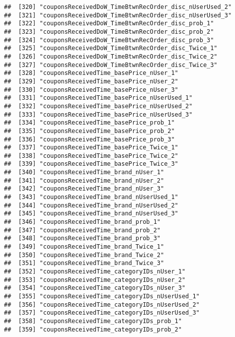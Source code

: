 \documentclass[10pt]{report}
\begin{document}
\begin{verbatim}
##  [320] "couponsReceivedDoW_TimeBtwnRecOrder_disc_nUserUsed_2" 
##  [321] "couponsReceivedDoW_TimeBtwnRecOrder_disc_nUserUsed_3" 
##  [322] "couponsReceivedDoW_TimeBtwnRecOrder_disc_prob_1"      
##  [323] "couponsReceivedDoW_TimeBtwnRecOrder_disc_prob_2"      
##  [324] "couponsReceivedDoW_TimeBtwnRecOrder_disc_prob_3"      
##  [325] "couponsReceivedDoW_TimeBtwnRecOrder_disc_Twice_1"     
##  [326] "couponsReceivedDoW_TimeBtwnRecOrder_disc_Twice_2"     
##  [327] "couponsReceivedDoW_TimeBtwnRecOrder_disc_Twice_3"     
##  [328] "couponsReceivedTime_basePrice_nUser_1"                
##  [329] "couponsReceivedTime_basePrice_nUser_2"                
##  [330] "couponsReceivedTime_basePrice_nUser_3"                
##  [331] "couponsReceivedTime_basePrice_nUserUsed_1"            
##  [332] "couponsReceivedTime_basePrice_nUserUsed_2"            
##  [333] "couponsReceivedTime_basePrice_nUserUsed_3"            
##  [334] "couponsReceivedTime_basePrice_prob_1"                 
##  [335] "couponsReceivedTime_basePrice_prob_2"                 
##  [336] "couponsReceivedTime_basePrice_prob_3"                 
##  [337] "couponsReceivedTime_basePrice_Twice_1"                
##  [338] "couponsReceivedTime_basePrice_Twice_2"                
##  [339] "couponsReceivedTime_basePrice_Twice_3"                
##  [340] "couponsReceivedTime_brand_nUser_1"                    
##  [341] "couponsReceivedTime_brand_nUser_2"                    
##  [342] "couponsReceivedTime_brand_nUser_3"                    
##  [343] "couponsReceivedTime_brand_nUserUsed_1"                
##  [344] "couponsReceivedTime_brand_nUserUsed_2"                
##  [345] "couponsReceivedTime_brand_nUserUsed_3"                
##  [346] "couponsReceivedTime_brand_prob_1"                     
##  [347] "couponsReceivedTime_brand_prob_2"                     
##  [348] "couponsReceivedTime_brand_prob_3"                     
##  [349] "couponsReceivedTime_brand_Twice_1"                    
##  [350] "couponsReceivedTime_brand_Twice_2"                    
##  [351] "couponsReceivedTime_brand_Twice_3"                    
##  [352] "couponsReceivedTime_categoryIDs_nUser_1"              
##  [353] "couponsReceivedTime_categoryIDs_nUser_2"              
##  [354] "couponsReceivedTime_categoryIDs_nUser_3"              
##  [355] "couponsReceivedTime_categoryIDs_nUserUsed_1"          
##  [356] "couponsReceivedTime_categoryIDs_nUserUsed_2"          
##  [357] "couponsReceivedTime_categoryIDs_nUserUsed_3"          
##  [358] "couponsReceivedTime_categoryIDs_prob_1"               
##  [359] "couponsReceivedTime_categoryIDs_prob_2"               

\end{verbatim}
\end{document}
